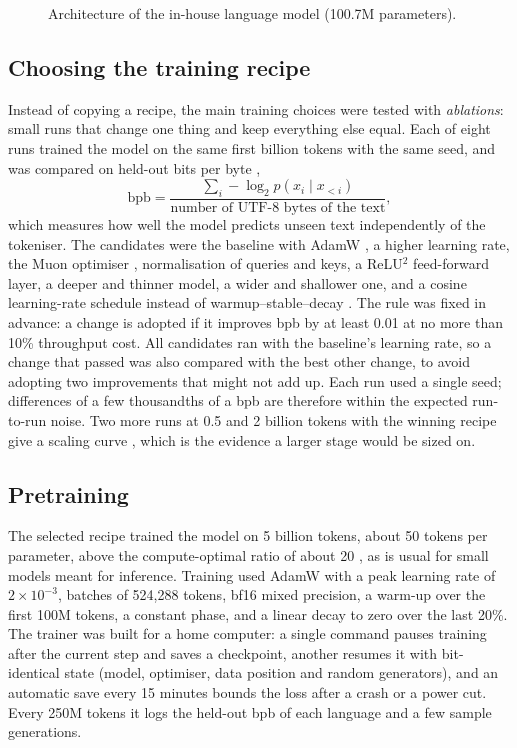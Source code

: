 \begin{figure}[H]
\centering
{}
\caption{Architecture of the in-house language model (100.7M parameters).}
\label{fig:ownllm-arch}
\end{figure}

\subsection*{Choosing the training recipe}

Instead of copying a recipe, the main training choices were tested with \textit{ablations}: small runs that change one thing and keep everything else equal. Each of eight runs trained the model on the same first billion tokens with the same seed, and was compared on held-out bits per byte \cite{gao2020pile},
\begin{equation}
\mathrm{bpb} = \frac{\sum_{i} -\log_2 p(x_i \mid x_{<i})}{\text{number of UTF-8 bytes of the text}},
\label{eq:bpb}
\end{equation}
which measures how well the model predicts unseen text independently of the tokeniser. The candidates were the baseline with AdamW \cite{loshchilov2019adamw}, a higher learning rate, the Muon optimiser \cite{jordan2024muon}, normalisation of queries and keys, a ReLU$^2$ feed-forward layer, a deeper and thinner model, a wider and shallower one, and a cosine learning-rate schedule instead of warmup--stable--decay \cite{hu2024minicpm}. The rule was fixed in advance: a change is adopted if it improves bpb by at least 0.01 at no more than 10\% throughput cost. All candidates ran with the baseline's learning rate, so a change that passed was also compared with the best other change, to avoid adopting two improvements that might not add up. Each run used a single seed; differences of a few thousandths of a bpb are therefore within the expected run-to-run noise. Two more runs at 0.5 and 2 billion tokens with the winning recipe give a scaling curve \cite{kaplan2020scaling}, which is the evidence a larger stage would be sized on.

\subsection*{Pretraining}

The selected recipe trained the model on 5 billion tokens, about 50 tokens per parameter, above the compute-optimal ratio of about 20 \cite{hoffmann2022chinchilla}, as is usual for small models meant for inference. Training used AdamW with a peak learning rate of $2\times10^{-3}$, batches of 524{,}288 tokens, bf16 mixed precision, a warm-up over the first 100M tokens, a constant phase, and a linear decay to zero over the last 20\%. The trainer was built for a home computer: a single command pauses training after the current step and saves a checkpoint, another resumes it with bit-identical state (model, optimiser, data position and random generators), and an automatic save every 15 minutes bounds the loss after a crash or a power cut. Every 250M tokens it logs the held-out bpb of each language and a few sample generations.

